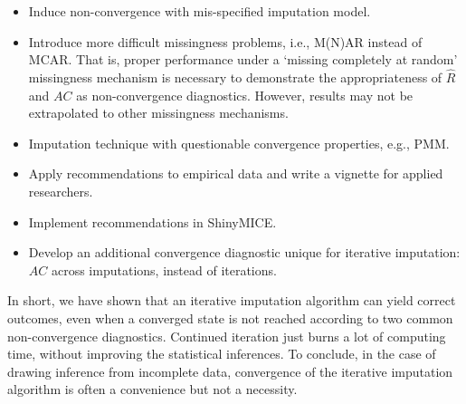 \documentclass[Royal,times,sageh]{sagej}
\begin{document}
\begin{itemize}
\item
  Induce non-convergence with mis-specified imputation model.
\item
  Introduce more difficult missingness problems, i.e., M(N)AR instead of MCAR. That is, proper performance under a `missing completely at random' missingness mechanism is necessary to demonstrate the appropriateness of \(\widehat{R}\) and \(AC\) as non-convergence diagnostics. However, results may not be extrapolated to other missingness mechanisms.
\item
  Imputation technique with questionable convergence properties, e.g., PMM.
\item
  Apply recommendations to empirical data and write a vignette for applied researchers.
\item
  Implement recommendations in ShinyMICE.
\item
  Develop an additional convergence diagnostic unique for iterative imputation: \(AC\) across imputations, instead of iterations.
\end{itemize}

In short, we have shown that an iterative imputation algorithm can yield correct outcomes, even when a converged state is not reached according to two common non-convergence diagnostics. Continued iteration just burns a lot of computing time, without improving the statistical inferences. To conclude, in the case of drawing inference from incomplete data, convergence of the iterative imputation algorithm is often a convenience but not a necessity.



\end{document}
